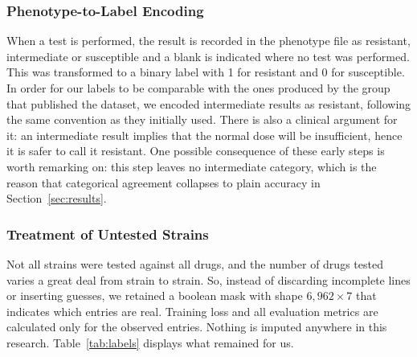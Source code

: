 \documentclass[journal]{IEEEtran}
\begin{document}
\subsubsection{Phenotype-to-Label Encoding}
When a test is performed, the result is recorded in the phenotype file as
resistant, intermediate or susceptible and a blank is indicated where no test was
performed. This was transformed to a binary label with 1 for resistant and 0 for
susceptible. In order for our labels to be comparable with the ones produced by the
group that published the dataset, we encoded intermediate results as resistant,
following the same convention as they initially used. There is also a clinical
argument for it: an intermediate result implies that the normal dose will be
insufficient, hence it is safer to call it resistant. One possible consequence of
these early steps is worth remarking on: this step leaves no intermediate category,
which is the reason that categorical agreement collapses to plain accuracy in
Section~\ref{sec:results}.

\subsubsection{Treatment of Untested Strains}
Not all strains were tested against all drugs, and the number of drugs tested
varies a great deal from strain to strain. So, instead of discarding incomplete
lines or inserting guesses, we retained a boolean mask with shape
$6{,}962 \times 7$ that indicates which entries are real. Training loss and all
evaluation metrics are calculated only for the observed entries. Nothing is imputed
anywhere in this research. Table~\ref{tab:labels} displays what remained for us.
\end{document}

